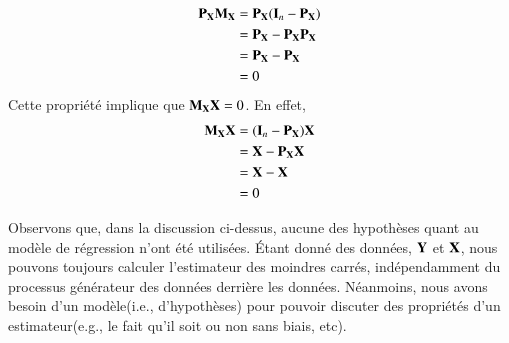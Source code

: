 \documentclass[10pt, reqno]{amsart}
\begin{document}
\begin{enumerate}
\begin{align*}
\mathbf P_\mathbf X\mathbf M_\mathbf X &= \mathbf P_\mathbf X(\mathbf{I}_n -  \mathbf P_\mathbf X)\\
& =  \mathbf P_\mathbf X -  \mathbf P_\mathbf X \mathbf P_\mathbf X\\
&= \mathbf P_\mathbf X- \mathbf P_\mathbf X\\
&=0
\end{align*}
Cette propriété implique que $\mathbf M_\mathbf X\mathbf X = 0$. En effet,
\begin{align*}
\mathbf M_\mathbf X\mathbf X &= (\mathbf{I}_n - \mathbf P_\mathbf X)\mathbf X\\ 
&= \mathbf X-\mathbf P_\mathbf X\mathbf X\\
& = \mathbf X - \mathbf X\\
& = 0
\end{align*}
\end{enumerate}
Observons que, dans la discussion ci-dessus, aucune des hypothèses quant au modèle de régression n'ont été utilisées. \'Etant donné des données, $\mathbf Y$ et $\mathbf X$, nous pouvons toujours calculer l'estimateur des moindres carrés, indépendamment du processus générateur des données derrière les données. Néanmoins, nous avons besoin d'un modèle(i.e., d'hypothèses) pour pouvoir discuter des propriétés d'un estimateur(e.g., le fait qu'il soit ou non sans biais, etc).
\end{document}
